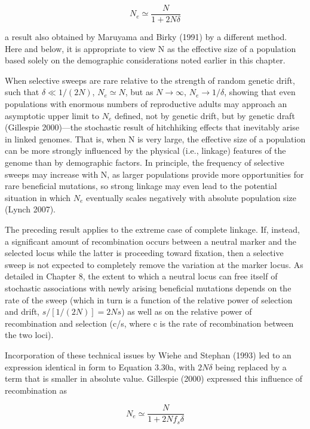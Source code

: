 \documentclass{article}
\begin{document}
\begin{equation}
N_{e}\simeq\frac{N}{1+2N\delta}
\tag{3.30a}
\label{eq:3_30a}
\end{equation}

a result also obtained by Maruyama and Birky (1991) by a different method. Here and below, it is appropriate to view N as the effective size of a population based solely on the demographic considerations noted earlier in this chapter.

When selective sweeps are rare relative to the strength of random genetic drift, such that  $ \delta \ll 1/(2N) $,  $ N_e \simeq N $, but as  $ N \to \infty $,  $ N_e \to 1/\delta $, showing that even populations with enormous numbers of reproductive adults may approach an asymptotic upper limit to  $ N_e $ defined, not by genetic drift, but by genetic draft (Gillespie 2000)—the stochastic result of hitchhiking effects that inevitably arise in linked genomes. That is, when N is very large, the effective size of a population can be more strongly influenced by the physical (i.e., linkage) features of the genome than by demographic factors. In principle, the frequency of selective sweeps may increase with N, as larger populations provide more opportunities for rare beneficial mutations, so strong linkage may even lead to the potential situation in which  $ N_e $ eventually scales negatively with absolute population size (Lynch 2007).

The preceding result applies to the extreme case of complete linkage. If, instead, a significant amount of recombination occurs between a neutral marker and the selected locus while the latter is proceeding toward fixation, then a selective sweep is not expected to completely remove the variation at the marker locus. As detailed in Chapter 8, the extent to which a neutral locus can free itself of stochastic associations with newly arising beneficial mutations depends on the rate of the sweep (which in turn is a function of the relative power of selection and drift,  $ s/[1/(2N)] = 2Ns $) as well as on the relative power of recombination and selection (c/s, where c is the rate of recombination between the two loci).

Incorporation of these technical issues by Wiehe and Stephan (1993) led to an expression identical in form to Equation 3.30a, with  $ 2N\delta $ being replaced by a term that is smaller in absolute value. Gillespie (2000) expressed this influence of recombination as

\begin{equation}
N_{e}\simeq\frac{N}{1+2N f_{s}\delta}
\tag{3.30b}
\label{eq:3_30b}
\end{equation}
\end{document}
